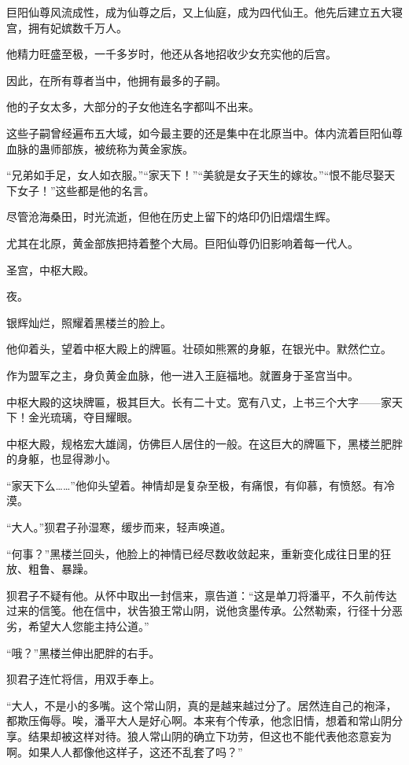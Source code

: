 \begin{this_body}
巨阳仙尊风流成性，成为仙尊之后，又上仙庭，成为四代仙王。他先后建立五大寝宫，拥有妃嫔数千万人。

他精力旺盛至极，一千多岁时，他还从各地招收少女充实他的后宫。

因此，在所有尊者当中，他拥有最多的子嗣。

他的子女太多，大部分的子女他连名字都叫不出来。

这些子嗣曾经遍布五大域，如今最主要的还是集中在北原当中。体内流着巨阳仙尊血脉的蛊师部族，被统称为黄金家族。

“兄弟如手足，女人如衣服。”“家天下！”“美貌是女子天生的嫁妆。”“恨不能尽娶天下女子！”这些都是他的名言。

尽管沧海桑田，时光流逝，但他在历史上留下的烙印仍旧熠熠生辉。

尤其在北原，黄金部族把持着整个大局。巨阳仙尊仍旧影响着每一代人。

圣宫，中枢大殿。

夜。

银辉灿烂，照耀着黑楼兰的脸上。

他仰着头，望着中枢大殿上的牌匾。壮硕如熊罴的身躯，在银光中。默然伫立。

作为盟军之主，身负黄金血脉，他一进入王庭福地。就置身于圣宫当中。

中枢大殿的这块牌匾，极其巨大。长有二十丈。宽有八丈，上书三个大字——家天下！金光琉璃，夺目耀眼。

中枢大殿，规格宏大雄阔，仿佛巨人居住的一般。在这巨大的牌匾下，黑楼兰肥胖的身躯，也显得渺小。

“家天下么……”他仰头望着。神情却是复杂至极，有痛恨，有仰慕，有愤怒。有冷漠。

“大人。”狈君子孙湿寒，缓步而来，轻声唤道。

“何事？”黑楼兰回头，他脸上的神情已经尽数收敛起来，重新变化成往日里的狂放、粗鲁、暴躁。

狈君子不疑有他。从怀中取出一封信来，禀告道：“这是单刀将潘平，不久前传达过来的信笺。他在信中，状告狼王常山阴，说他贪墨传承。公然勒索，行径十分恶劣，希望大人您能主持公道。”

“哦？”黑楼兰伸出肥胖的右手。

狈君子连忙将信，用双手奉上。

“大人，不是小的多嘴。这个常山阴，真的是越来越过分了。居然连自己的袍泽，都欺压侮辱。唉，潘平大人是好心啊。本来有个传承，他念旧情，想着和常山阴分享。结果却被这样对待。狼人常山阴的确立下功劳，但这也不能代表他恣意妄为啊。如果人人都像他这样子，这还不乱套了吗？”


\end{this_body}
